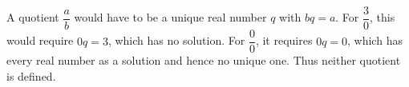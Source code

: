 A quotient $\dfrac{a}{b}$ would have to be a unique real number $q$ with $bq=a$. For $\dfrac{3}{0}$, this would require $0q=3$, which has no solution. For $\dfrac{0}{0}$, it requires $0q=0$, which has every real number as a solution and hence no unique one. Thus neither quotient is defined.
